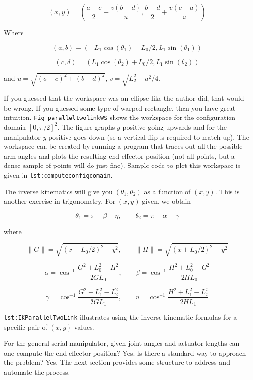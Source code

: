 \[(x,y) = \left( \frac{a+c}{2} + \frac{v (b-d)}{u} , \frac{b+d}{2} + \frac{v (c-a)}{u} \right)\]

Where

\[(a,b) = (-L_1 \cos(\theta_1) - L_0/2 , L_1 \sin(\theta_1) )\]

\[(c,d) = (L_1 \cos(\theta_2) + L_0/2 , L_1 \sin(\theta_2) )\]

and \(u = \sqrt{(a-c)^2 + (b-d)^2}\), \(v  = \sqrt{L_2^2 - u^2/4}\).

If you guessed that the workspace was an ellipse like the author did,
that would be wrong. If you guessed some type of warped rectangle, then
you have great intuition. \texttt{Fig:paralleltwolinkWS} shows the
workspace for the configuration domain \([0, \pi/2]^2\). The figure
graphs \(y\) positive going upwards and for the manipulator \(y\)
positive goes down (so a vertical flip is required to match up). The
workspace can be created by running a program that traces out all the
possible arm angles and plots the resulting end effector position (not
all points, but a dense sample of points will do just fine). Sample code
to plot this workspace is given in \texttt{lst:computeconfigdomain}.

The inverse kinematics will give you \((\theta_1, \theta_2)\) as a
function of \((x,y)\). This is another exercise in trigonometry. For
\((x,y)\) given, we obtain

\[\theta_1  = \pi - \beta - \eta , \quad \quad \theta_2 = \pi - \alpha - \gamma\]

where

\[\| G \| = \sqrt{(x-L_0/2)^2 + y^2},  \quad\quad \| H\| = \sqrt{(x+L_0/2)^2 + y^2}\]

\[\alpha = \cos^{-1} \frac{G^2 + L_0^2 - H^2 }{2GL_0}, \quad \quad \beta = \cos^{-1} \frac{H^2 + L_0^2 - G^2 }{2HL_0}\]

\[\gamma = \cos^{-1} \frac{G^2 + L_1^2 - L_2^2 }{2GL_1},\quad \quad \eta =  \cos^{-1} \frac{H^2 + L_1^2 - L_2^2 }{2HL_1}\]

\texttt{lst:IKParallelTwoLink} illustrates using the inverse kinematic
formulas for a specific pair of \((x,y)\) values.

For the general serial manipulator, given joint angles and actuator
lengths can one compute the end effector position? Yes. Is there a
standard way to approach the problem? Yes. The next section provides
some structure to address and automate the process.
